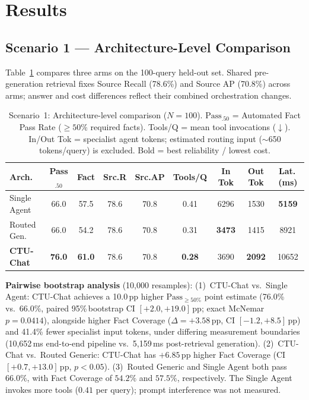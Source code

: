 \section{Results}
\label{sec:results}

\subsection{Scenario 1 --- Architecture-Level Comparison}
\label{sec:s1_results}

Table~\ref{tab:arch_comparison} compares three arms on the 100-query held-out set. Shared pre-generation retrieval fixes Source Recall (78.6\%) and Source AP (70.8\%) across arms; answer and cost differences reflect their combined orchestration changes.

\begin{table}[!htbp]
\centering
\caption{Scenario~1: Architecture-level comparison ($N=100$). $\text{Pass}_{.50}$ = Automated Fact Pass Rate ($\ge 50\%$ required facts). Tools/Q = mean tool invocations ($\downarrow$). In/Out Tok = specialist agent tokens; estimated routing input ($\sim$650 tokens/query) is excluded. Bold = best reliability / lowest cost.}
\label{tab:arch_comparison}
{\small\setlength{\tabcolsep}{3.5pt}
\begin{tabular}{lcccccccc}
\toprule
\textbf{Arch.} & \textbf{Pass$_{.50}$} & \textbf{Fact} & \textbf{Src.R} & \textbf{Src.AP} & \textbf{Tools/Q} & \textbf{In Tok} & \textbf{Out Tok} & \textbf{Lat.\,(ms)} \\
\midrule
Single Agent   & 66.0 & 57.5 & 78.6 & 70.8 & 0.41 & 6296 & 1530 & \textbf{5159} \\
Routed Gen.    & 66.0 & 54.2 & 78.6 & 70.8 & 0.31 & \textbf{3473} & 1415 & 8921 \\
\textbf{CTU-Chat} & \textbf{76.0} & \textbf{61.0} & 78.6 & 70.8 & \textbf{0.28} & 3690 & \textbf{2092} & 10652 \\
\bottomrule
\end{tabular}}
\end{table}

\textbf{Pairwise bootstrap analysis} (10,000 resamples):
(1)~CTU-Chat vs.\ Single Agent: CTU-Chat achieves a 10.0\,pp higher $\text{Pass}_{\ge 50\%}$ point estimate (76.0\% vs.\ 66.0\%, paired 95\%\,bootstrap CI $[+2.0, +19.0]$\,pp; exact McNemar $p{=}0.0414$), alongside higher Fact Coverage ($\Delta{=}+3.58$\,pp, CI $[-1.2, +8.5]$\,pp) and 41.4\% fewer specialist input tokens, under differing measurement boundaries (10{,}652\,ms end-to-end pipeline vs.\ 5{,}159\,ms post-retrieval generation).
(2)~CTU-Chat vs.\ Routed Generic: CTU-Chat has $+6.85$\,pp higher Fact Coverage (CI $[+0.7, +13.0]$\,pp, $p{<}0.05$).
(3)~Routed Generic and Single Agent both pass $66.0\%$, with Fact Coverage of $54.2\%$ and $57.5\%$, respectively. The Single Agent invokes more tools ($0.41$ per query); prompt interference was not measured.

